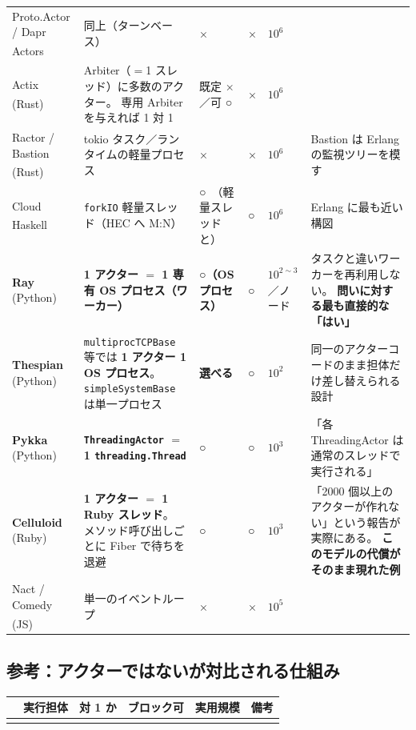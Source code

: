 \documentclass[11pt,a4paper]{ltjsarticle}
\newcommand{\dg}{\textsuperscript{\dag}}
\newcommand{\yes}{\textbf{○}}
\newcommand{\no}{×}
\begin{document}
\begin{landscape}
\begin{longtable}{@{}p{3.3cm}p{4.6cm}>{\raggedright\arraybackslash}p{2.5cm}>{\raggedright\arraybackslash}p{2.6cm}>{\raggedright\arraybackslash}p{1.5cm}p{6.0cm}@{}}
Proto.Actor / Dapr Actors\dg
  & 同上（ターンベース）
  & \no
  & \no
  & $10^{6}$
  & \\

Actix (Rust)\dg
  & Arbiter（$=$1 スレッド）に多数のアクター。
    専用 Arbiter を与えれば 1 対 1
  & 既定 \no ／可 \yes
  & \no
  & $10^{6}$
  & \\

Ractor / Bastion (Rust)\dg
  & tokio タスク／ランタイムの軽量プロセス
  & \no
  & \no
  & $10^{6}$
  & Bastion は Erlang の監視ツリーを模す \\

Cloud Haskell\dg
  & \texttt{forkIO} 軽量スレッド（HEC へ M:N）
  & \yes\ （軽量スレッドと）
  & \yes
  & $10^{6}$
  & Erlang に最も近い構図 \\

\textbf{Ray} (Python)
  & \textbf{1 アクター $=$ 1 専有 OS プロセス（ワーカー）}
  & \textbf{\yes（OS プロセス）}
  & \yes
  & $10^{2\sim3}$／ノード
  & タスクと違いワーカーを再利用しない。
    \textbf{問いに対する最も直接的な「はい」} \\

\textbf{Thespian} (Python)
  & \texttt{multiprocTCPBase} 等では \textbf{1 アクター 1 OS プロセス}。
    \texttt{simpleSystemBase} は単一プロセス
  & \textbf{選べる}
  & \yes
  & $10^{2}$
  & 同一のアクターコードのまま担体だけ差し替えられる設計 \\

\textbf{Pykka} (Python)
  & \textbf{\texttt{ThreadingActor} $=$ 1 \texttt{threading.Thread}}
  & \textbf{\yes}
  & \yes
  & $10^{3}$
  & 「各 ThreadingActor は通常のスレッドで実行される」 \\

\textbf{Celluloid} (Ruby)
  & \textbf{1 アクター $=$ 1 Ruby スレッド}。
    メソッド呼び出しごとに Fiber で待ちを退避
  & \textbf{\yes}
  & \yes
  & $10^{3}$
  & 「2000 個以上のアクターが作れない」という報告が実際にある。
    \textbf{このモデルの代償がそのまま現れた例} \\

Nact / Comedy (JS)\dg
  & 単一のイベントループ
  & \no
  & \no
  & $10^{5}$
  & \\
\end{longtable}

\subsection{参考：アクターではないが対比される仕組み}

\begin{longtable}{@{}p{3.3cm}p{4.6cm}>{\raggedright\arraybackslash}p{2.5cm}>{\raggedright\arraybackslash}p{2.6cm}>{\raggedright\arraybackslash}p{1.5cm}p{6.0cm}@{}}
\toprule
 & 実行担体 & 1 対 1 か & ブロック可 & 実用規模 & 備考 \\
\midrule
\endfirsthead
\endhead
\bottomrule
\endfoot


\end{longtable}
\end{landscape}
\end{document}
